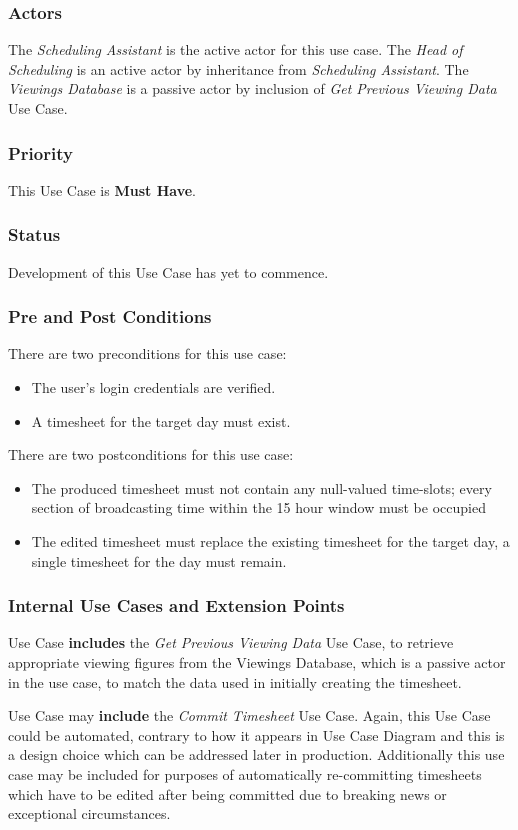 \documentclass[11pt, oneside]{article}
\begin{document}
\subsubsection*{Actors}
The \textit{Scheduling Assistant} is the active actor for this use case.
The \textit{Head of Scheduling} is an active actor by inheritance from \textit{Scheduling Assistant}.
The \textit{Viewings Database} is a passive actor by inclusion of \textit{Get Previous Viewing Data} Use Case.
\subsubsection*{Priority}
This Use Case is \textbf{Must Have}.
\subsubsection*{Status}
Development of this Use Case has yet to commence.
\subsubsection*{Pre and Post Conditions}
There are two preconditions for this use case:
\begin{itemize}
\item The user's login credentials are verified.
\item A timesheet for the target day must exist.
\end{itemize}
There are two postconditions for this use case:
\begin{itemize}
 \item The produced timesheet must not contain any null-valued time-slots; every section of broadcasting time within the 15 hour window must be occupied
 \item The edited timesheet must replace the existing timesheet for the target day, a single timesheet for the day must remain.
 \end{itemize}
 \subsubsection*{Internal Use Cases and Extension Points} 
Use Case \textbf{includes} the \textit{Get Previous Viewing Data} Use Case, to retrieve appropriate viewing figures from the Viewings Database, which is a passive actor in the use case, to match the data used in initially creating the timesheet.

Use Case may \textbf{include} the \textit{Commit Timesheet} Use Case. Again, this Use Case could be automated, contrary to how it appears in Use Case Diagram and this is a design choice which can be addressed later in production. Additionally this use case may be included for purposes of automatically re-committing timesheets which have to be edited after being committed due to breaking news or exceptional circumstances.
\end{document}
